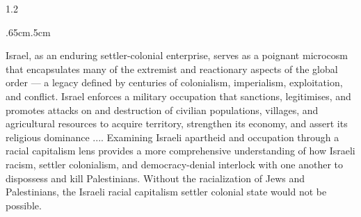 \documentclass[../unravbook.tex]{subfiles}
\begin{document}
\begin{spacing}{1.2}
\begin{adjustwidth}{.65cm}{.5cm}
    \begin{singlespace}
        Israel, as an enduring settler-colonial enterprise, serves as a poignant microcosm that encapsulates many of the extremist and reactionary aspects of the global order — a legacy defined by centuries of colonialism, imperialism, exploitation, and conflict. Israel enforces a military occupation that sanctions, legitimises, and promotes attacks on and destruction of civilian populations, villages, and agricultural resources to acquire territory, strengthen its economy, and assert its religious dominance .... Examining Israeli apartheid and occupation through a racial capitalism lens provides a more comprehensive understanding of how Israeli racism, settler colonialism, and democracy-denial interlock with one another to dispossess and kill Palestinians. Without the racialization of Jews and Palestinians, the Israeli racial capitalism settler colonial state would not be possible.
    \end{singlespace}
\end{adjustwidth}


\end{spacing}
\end{document}
